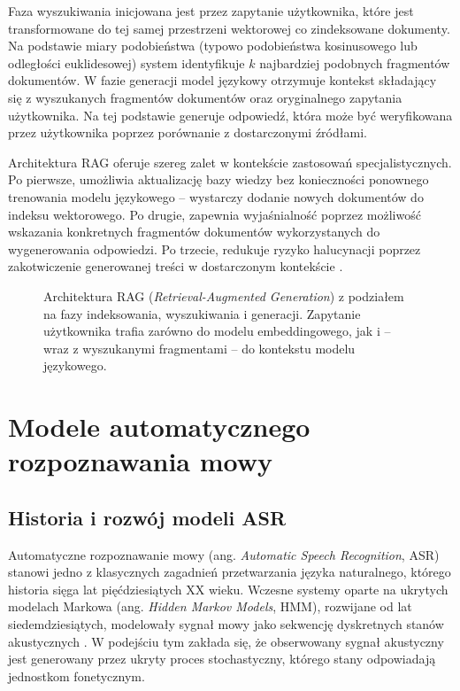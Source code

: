 Faza wyszukiwania inicjowana jest przez zapytanie użytkownika, które jest transformowane do tej samej przestrzeni wektorowej co zindeksowane dokumenty. Na podstawie miary podobieństwa (typowo podobieństwa kosinusowego lub odległości euklidesowej) system identyfikuje $k$ najbardziej podobnych fragmentów dokumentów. W fazie generacji model językowy otrzymuje kontekst składający się z wyszukanych fragmentów dokumentów oraz oryginalnego zapytania użytkownika. Na tej podstawie generuje odpowiedź, która może być weryfikowana przez użytkownika poprzez porównanie z dostarczonymi źródłami.

Architektura RAG oferuje szereg zalet w kontekście zastosowań specjalistycznych. Po pierwsze, umożliwia aktualizację bazy wiedzy bez konieczności ponownego trenowania modelu językowego -- wystarczy dodanie nowych dokumentów do indeksu wektorowego. Po drugie, zapewnia wyjaśnialność poprzez możliwość wskazania konkretnych fragmentów dokumentów wykorzystanych do wygenerowania odpowiedzi. Po trzecie, redukuje ryzyko halucynacji poprzez zakotwiczenie generowanej treści w dostarczonym kontekście \cite{shuster2021retrieval}.

\begin{figure}[htbp]
    \centering
    \caption{Architektura RAG (\textit{Retrieval-Augmented Generation}) z podziałem na fazy indeksowania, wyszukiwania i generacji. Zapytanie użytkownika trafia zarówno do modelu embeddingowego, jak i -- wraz z wyszukanymi fragmentami -- do kontekstu modelu językowego.}
    \label{fig:ragArchitecture}
\end{figure}


\section{Modele automatycznego rozpoznawania mowy}
\label{sec:modeleASR}

\subsection{Historia i rozwój modeli ASR}

Automatyczne rozpoznawanie mowy (ang. \textit{Automatic Speech Recognition}, ASR) stanowi jedno z klasycznych zagadnień przetwarzania języka naturalnego, którego historia sięga lat pięćdziesiątych XX wieku. Wczesne systemy oparte na ukrytych modelach Markowa (ang. \textit{Hidden Markov Models}, HMM), rozwijane od lat siedemdziesiątych, modelowały sygnał mowy jako sekwencję dyskretnych stanów akustycznych \cite{rabiner1989tutorial}. W podejściu tym zakłada się, że obserwowany sygnał akustyczny jest generowany przez ukryty proces stochastyczny, którego stany odpowiadają jednostkom fonetycznym.

